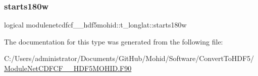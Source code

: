 \subsubsection{\texorpdfstring{starts180w}{starts180w}}
{\footnotesize\ttfamily logical modulenetcdfcf\+\_\+\_\+hdf5mohid\+::t\+\_\+longlat\+::starts180w\hspace{0.3cm}{\ttfamily [private]}}



The documentation for this type was generated from the following file\+:\begin{DoxyCompactItemize}
\item 
C\+:/\+Users/administrator/\+Documents/\+Git\+Hub/\+Mohid/\+Software/\+Convert\+To\+H\+D\+F5/\mbox{\hyperlink{_module_net_c_d_f_c_f__2___h_d_f5_m_o_h_i_d_8_f90}{Module\+Net\+C\+D\+F\+C\+F\+\_\+\_\+\+H\+D\+F5\+M\+O\+H\+I\+D.\+F90}}\end{DoxyCompactItemize}
